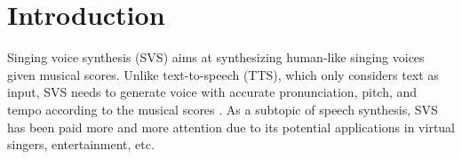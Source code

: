 \section{Introduction}
\label{sec:intro}



Singing voice synthesis (SVS) aims at synthesizing human-like singing voices given musical scores.
Unlike text-to-speech (TTS), which only considers text as input, SVS needs to generate voice with accurate pronunciation, pitch, and tempo according to the musical scores \cite{hono2018recent,gu2021bytesing}. As a subtopic of speech synthesis, SVS has been paid more and more attention due to its potential applications in virtual singers, entertainment, etc.


